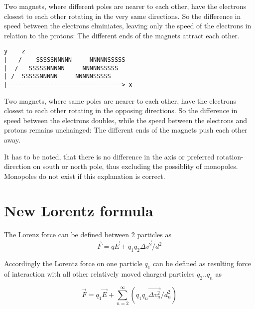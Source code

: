 \documentclass[12pt,a4paper,twocolumn]{article}
\begin{document}
Two magnets, where different poles are nearer to each other, have the electrons closest to each other rotating in the very same directions. So the difference in speed between the electrons elminiates, leaving only the speed of the electrons in relation to the protons: The different ends of the magnets attract each other.

\begin{verbatim}
y    z
|   /    SSSSSNNNNN     NNNNNSSSSS
|  /   SSSSSNNNNN     NNNNNSSSSS
| /  SSSSSNNNNN     NNNNNSSSSS
|--------------------------------> x
\end{verbatim}

Two magnets, where same poles are nearer to each other, have the electrons closest to each other rotating in the opposing directions. So the difference in speed between the electrons doubles, while the speed between the electrons and protons remains unchainged: The different ends of the magnets push each other away.

It has to be noted, that there is no difference in the axis or preferred rotation-direction on south or north pole, thus excluding the possiblity of monopoles. Monopoles do not exist if this explanation is correct.

\section{New Lorentz formula}
The Lorenz force can be defined between 2 particles as $$\vec{F}=q\vec{E} + q_1 q_2 \vec{\Delta v^2} / d^2$$

Accordingly the Lorentz force on one particle $q_1$ can be defined as resulting force of interaction with all other relatively moved charged particles $q_2 .. q_n$ as 

$$\vec{F}=q_1\vec{E} + \sum_{n=2}^{\infty}(q_1 q_n \vec{\Delta v_n^2} / d_n^2)$$
\end{document}
